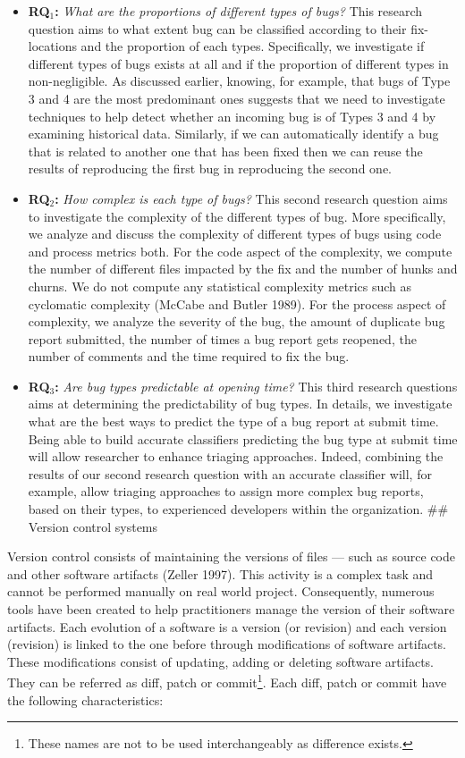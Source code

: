 \documentclass[natbib]{svjour3}
\begin{document}
\begin{itemize}
\item
  \textbf{RQ\(_1\):} \emph{What are the proportions of different types
  of bugs?} This research question aims to what extent bug can be
  classified according to their fix-locations and the proportion of each
  types. Specifically, we investigate if different types of bugs exists
  at all and if the proportion of different types in non-negligible. As
  discussed earlier, knowing, for example, that bugs of Type 3 and 4 are
  the most predominant ones suggests that we need to investigate
  techniques to help detect whether an incoming bug is of Types 3 and 4
  by examining historical data. Similarly, if we can automatically
  identify a bug that is related to another one that has been fixed then
  we can reuse the results of reproducing the first bug in reproducing
  the second one.
\item
  \textbf{RQ\(_2\):} \emph{How complex is each type of bugs?} This
  second research question aims to investigate the complexity of the
  different types of bug. More specifically, we analyze and discuss the
  complexity of different types of bugs using code and process metrics
  both. For the code aspect of the complexity, we compute the number of
  different files impacted by the fix and the number of hunks and
  churns. We do not compute any statistical complexity metrics such as
  cyclomatic complexity (McCabe and Butler 1989). For the process aspect
  of complexity, we analyze the severity of the bug, the amount of
  duplicate bug report submitted, the number of times a bug report gets
  reopened, the number of comments and the time required to fix the bug.
\item
  \textbf{RQ\(_3\):} \emph{Are bug types predictable at opening time?}
  This third research questions aims at determining the predictability
  of bug types. In details, we investigate what are the best ways to
  predict the type of a bug report at submit time. Being able to build
  accurate classifiers predicting the bug type at submit time will allow
  researcher to enhance triaging approaches. Indeed, combining the
  results of our second research question with an accurate classifier
  will, for example, allow triaging approaches to assign more complex
  bug reports, based on their types, to experienced developers within
  the organization. \#\# Version control
  systems\label{sec:version-control}
\end{itemize}

Version control consists of maintaining the versions of files --- such
as source code and other software artifacts (Zeller 1997). This activity
is a complex task and cannot be performed manually on real world
project. Consequently, numerous tools have been created to help
practitioners manage the version of their software artifacts. Each
evolution of a software is a version (or revision) and each version
(revision) is linked to the one before through modifications of software
artifacts. These modifications consist of updating, adding or deleting
software artifacts. They can be referred as diff, patch or
commit\footnote{These names are not to be used interchangeably as difference exists.}.
Each diff, patch or commit have the following characteristics:
\end{document}
